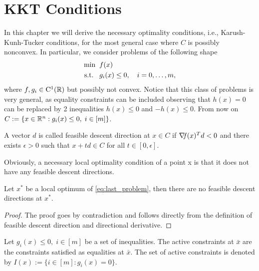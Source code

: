 \documentclass[10pt,a4paper]{article}
\begin{document}
\section{KKT Conditions}
In this chapter we will derive the necessary optimality conditions, i.e., Karush-Kunh-Tucker conditions, for the most general case where $C$ is possibly nonconvex. In particular, we consider problems of the following shape
\begin{equation}\label{eq:last_problem}
\begin{split}
\min \;\; &f(x)\\
\text{s.t.} \;\;\;& g_i(x)\leq 0, \quad i=0, \dots, m,
\end{split}
\end{equation}
where $f,g_i\in \mathord{\mathrm{C^1}}(\mathbb{R})$ but possibly not convex. Notice that this class of problems is very general, as equality constraints can be included observing that $h(x)=0$ can be replaced by 2 inequalities $h(x)\leq0$ and $-h(x)\leq 0$. From now on $C:=\{x\in\mathbb{R}^n: g_i(x)\leq 0, \; i\in [m] \}$. 
\begin{definition} A vector $d$ is called feasible descent direction at $x\in C$ if $\operatorname*{\mathit{\nabla \!f}}(x)^Td<0$ and there exists $\epsilon>0$ such that $x+td\in C$ for all $t\in [0,\epsilon].$

\end{definition}
\noindent Obviously, a necessary local optimality condition of a point x is that it does not have
any feasible descent directions.
\begin{lemma} Let $x^*$ be a local optimum of \eqref{eq:last_problem}, then there are no feasible descent directions at $x^*.$
\end{lemma}
\begin{proof}
The proof goes by contradiction and follows directly from the definition of feasible descent direction and directional derivative.
\end{proof}
\begin{definition} Let $g_i(x)\leq 0, \; i\in [m] $ be a set of inequalities. The active constraints at $\bar{x}$ are the constraints satisfied as equalities at $\bar{x}$. The set of active constraints is denoted by $I(x):=\{i\in[m]: g_i(x)=0\}.$
\end{definition}
\end{document}

